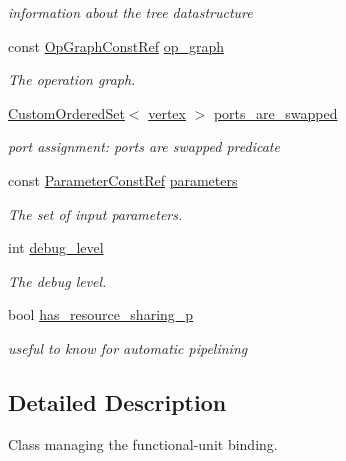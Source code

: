 \begin{DoxyCompactItemize}
\begin{DoxyCompactList}\small\item\em information about the tree datastructure \end{DoxyCompactList}\item 
const \hyperlink{op__graph_8hpp_a9a0b240622c47584bee6951a6f5de746}{Op\+Graph\+Const\+Ref} \hyperlink{classfu__binding_a8759f9722b6fc616b5746be4de120806}{op\+\_\+graph}
\begin{DoxyCompactList}\small\item\em The operation graph. \end{DoxyCompactList}\item 
\hyperlink{classCustomOrderedSet}{Custom\+Ordered\+Set}$<$ \hyperlink{graph_8hpp_abefdcf0544e601805af44eca032cca14}{vertex} $>$ \hyperlink{classfu__binding_a9e77e56499e883cc67585bc3f943e249}{ports\+\_\+are\+\_\+swapped}
\begin{DoxyCompactList}\small\item\em port assignment\+: ports are swapped predicate \end{DoxyCompactList}\item 
const \hyperlink{Parameter_8hpp_a37841774a6fcb479b597fdf8955eb4ea}{Parameter\+Const\+Ref} \hyperlink{classfu__binding_aa372286fd7ddc5ce6424afba333bb80a}{parameters}
\begin{DoxyCompactList}\small\item\em The set of input parameters. \end{DoxyCompactList}\item 
int \hyperlink{classfu__binding_a664f07a748303e2bcea5fbcdd5d26848}{debug\+\_\+level}
\begin{DoxyCompactList}\small\item\em The debug level. \end{DoxyCompactList}\item 
bool \hyperlink{classfu__binding_a0803cef962aeb99cc0d822c4d076d25c}{has\+\_\+resource\+\_\+sharing\+\_\+p}
\begin{DoxyCompactList}\small\item\em useful to know for automatic pipelining \end{DoxyCompactList}\end{DoxyCompactItemize}


\subsection{Detailed Description}
Class managing the functional-\/unit binding. 

